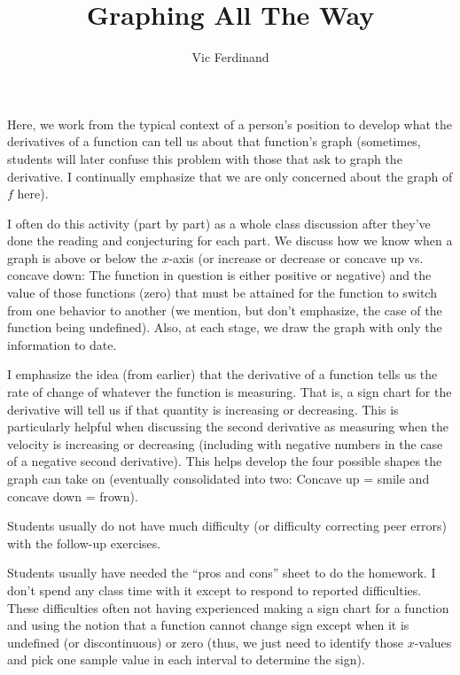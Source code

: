 \documentclass{ximera}
\author{Vic Ferdinand}
\title{Graphing All The Way}
\begin{document}
\begin{abstract}
\end{abstract}
\maketitle

\begin{instructorIntro}
Here, we work from the typical context of a person's position to develop what the derivatives of a function can tell us about that function's graph (sometimes, students will later confuse this problem with those that ask to graph the derivative.  I continually emphasize that we are only concerned about the graph of $f$ here).

I often do this activity (part by part) as a whole class discussion after they've done the reading and conjecturing for each part.  We discuss how we know when a graph is above or below the $x$-axis (or increase or decrease or concave up vs. concave down:  The function in question is either positive or negative) and the value of those functions (zero) that must be attained for the function to switch from one behavior to another (we mention, but don't emphasize, the case of the function being undefined).  Also, at each stage, we draw the graph with only the information to date.

I emphasize the idea (from earlier) that the derivative of a function tells us the rate of change of whatever the function is measuring.  That is, a sign chart for the derivative will tell us if that quantity is increasing or decreasing.  This is particularly helpful when discussing the second derivative as measuring when the velocity is increasing or decreasing (including with negative numbers in the case of a negative second derivative).  This helps develop the four possible shapes the graph can take on (eventually consolidated into two:  Concave up = smile and concave down = frown).

Students usually do not have much difficulty (or difficulty correcting peer errors) with the follow-up exercises.

Students usually have needed the ``pros and cons'' sheet to do the homework.  I don't spend any class time with it except to respond to reported difficulties.  These difficulties often not having experienced making a sign chart for a function and using the notion that a function cannot change sign except when it is undefined (or discontinuous) or zero (thus, we just need to identify those $x$-values and pick one sample value in each interval to determine the sign).

\end{instructorIntro}
\end{document}
